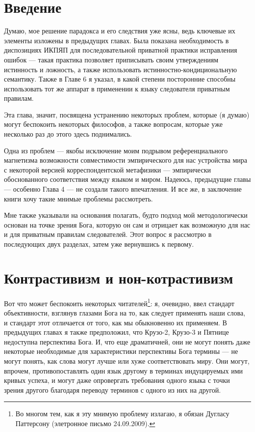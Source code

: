 \documentclass[11pt]{book}
\begin{document}
\qquad

\section{Введение}

Думаю, мое решение парадокса и его следствия уже ясны, ведь ключевые их элементы изложены в предыдущих главах. Была показана необходимость в диспозициях ИКПЯП для последовательной приватной практики исправления ошибок --- такая практика позволяет приписывать своим утверждениям истинность и ложность, а также использовать истинностно-кондициональную семантику. Также в Главе 6 я указал, в какой степени посторонние способны использовать тот же аппарат в применении к языку следователя приватным правилам.

Эта глава, значит, посвящена устранению некоторых проблем, которые (я думаю) могут беспокоить некоторых философов, а также вопросам, которые уже несколько раз до этого здесь поднимались.

Одна из проблем --- якобы исключение моим подрывом референциального магнетизма возможности совместимости эмпирического для нас устройства мира с некоторой версией корреспондентской метафизики --- эмпирически обоснованного соответствия между языком и миром. Надеюсь, предыдущие главы --- особенно Глава 4 --- не создали такого впечатления. И все же, в заключение книги хочу такие мнимые проблемы рассмотреть.

Мне также указывали на основания полагать, будто подход мой методологически основан на точке зрения Бога, которую он сам и отрицает как возможную для нас и для приватным правилам следователей. Этот вопрос я рассмотрю в последующих двух разделах, затем уже вернувшись к первому.

\section{Контрастивизм и нон-котрастивизм}

Вот что может беспокоить некоторых читателей\footnote{Во многом тем, как я эту мнимую проблему излагаю, я обязан Дугласу Паттерсону (элетронное письмо 24.09.2009).}: я, очевидно, ввел стандарт объективности, взглянув глазами Бога на то, как следует применять наши слова, и стандарт этот отличается от того, как мы обыкновенно их применяем. В предыдущих главах я также предположил, что Крузо-2, Крузо-3 и Пятнице недоступна перспектива Бога. И, что еще драматичней, они не могут понять даже некоторые необходимые для характеристики перспективы Бога термины --- не могут понять, как слова могут лучше или хуже соответствовать миру. Они могут, впрочем, противопоставлять один язык другому в терминах индуцируемых ими кривых успеха, и могут даже опровергать требования одного языка с точки зрения другого благодаря переводу терминов с одного из них на другой.
\end{document}
